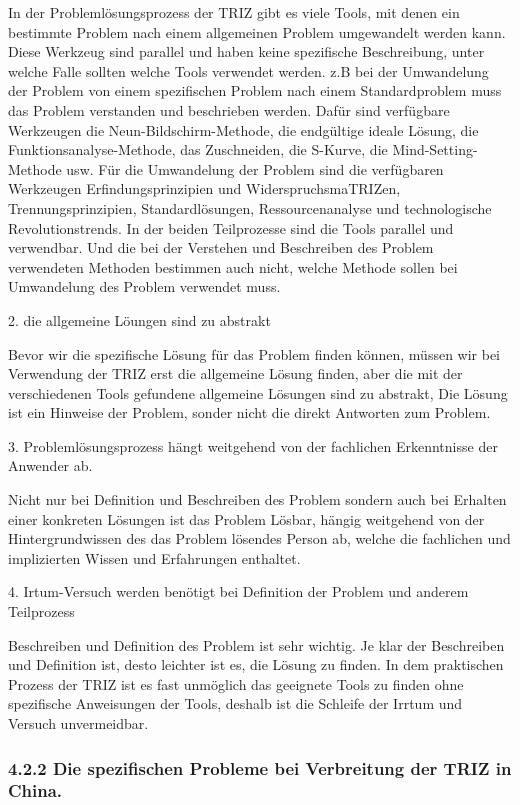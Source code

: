 \documentclass[11pt,a4paper]{article}
\begin{document}
In der Problemlösungsprozess der TRIZ gibt es viele Tools, mit denen ein
bestimmte Problem nach einem allgemeinen Problem umgewandelt werden
kann. Diese Werkzeug sind parallel und haben keine spezifische Beschreibung,
unter welche Falle sollten welche Tools verwendet werden. z.B bei der
Umwandelung der Problem von einem spezifischen Problem nach einem
Standardproblem muss das Problem verstanden und beschrieben werden. Dafür sind
verfügbare Werkzeugen die Neun-Bildschirm-Methode, die endgültige ideale
Lösung, die Funktionsanalyse-Methode, das Zuschneiden, die S-Kurve, die
Mind-Setting-Methode usw. Für die Umwandelung der Problem sind die verfügbaren
Werkzeugen Erfindungsprinzipien und WiderspruchsmaTRIZen, Trennungsprinzipien,
Standardlösungen, Ressourcenanalyse und technologische Revolutionstrends. In
der beiden Teilprozesse sind die Tools parallel und verwendbar. Und die bei
der Verstehen und Beschreiben des Problem verwendeten Methoden bestimmen auch
nicht, welche Methode sollen bei Umwandelung des Problem verwendet muss.

2. die allgemeine Löungen sind  zu abstrakt

Bevor wir die spezifische Lösung für das Problem finden können, müssen wir
bei Verwendung der TRIZ erst die allgemeine Lösung finden, aber die mit der
verschiedenen Tools gefundene allgemeine Lösungen sind zu abstrakt, Die Lösung
ist ein Hinweise der Problem, sonder nicht die direkt Antworten zum Problem.

3. Problemlösungsprozess hängt weitgehend von der fachlichen Erkenntnisse der
Anwender ab.

Nicht nur bei Definition und Beschreiben des Problem sondern auch bei Erhalten
einer konkreten Lösungen ist das Problem Lösbar, hängig weitgehend von der
Hintergrundwissen des das Problem lösendes Person  ab, welche die fachlichen
und implizierten Wissen und Erfahrungen enthaltet.

4. Irtum-Versuch werden benötigt bei Definition der Problem und anderem
Teilprozess

Beschreiben und Definition des Problem ist sehr wichtig. Je klar der
Beschreiben und Definition ist, desto leichter ist es, die Lösung zu
finden. In dem praktischen Prozess der TRIZ ist es fast unmöglich das
geeignete Tools zu finden ohne spezifische Anweisungen der Tools, deshalb ist
die Schleife der Irrtum und Versuch unvermeidbar.


\subsubsection{4.2.2  Die spezifischen Probleme bei Verbreitung der TRIZ in
  China.}
\end{document}
